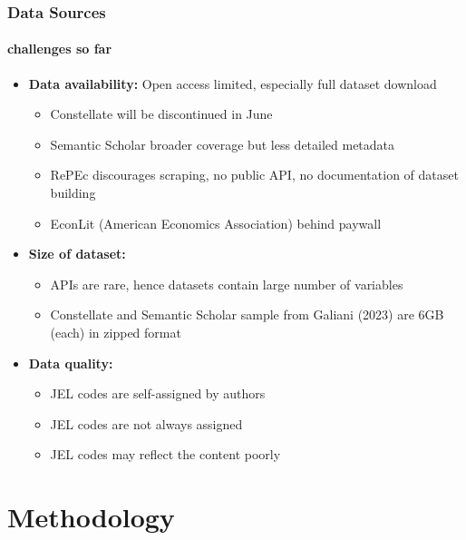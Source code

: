 \documentclass[aspectratio=1610]{beamer}
\begin{document}
\begin{frame}
	\frametitle{Data Sources}
		\framesubtitle{challenges so far}
	
		\begin{itemize}
			\item \textbf{Data availability:} Open access limited, especially full dataset download
			\begin{itemize}
				\item Constellate will be discontinued in June
				\item Semantic Scholar broader coverage but less detailed metadata
				\item RePEc discourages scraping, no public API, no documentation of dataset building
				\item EconLit (American Economics Association) behind paywall
			\end{itemize}
			\item \textbf{Size of dataset:} 
			\begin{itemize}
				\item APIs are rare, hence datasets contain large number of variables
				\item Constellate and Semantic Scholar sample from Galiani (2023) are 6GB (each) in zipped format
			\end{itemize}
			\item \textbf{Data quality:}
			\begin{itemize}
				\item JEL codes are self-assigned by authors
				\item JEL codes are not always assigned
				\item JEL codes may reflect the content poorly
			\end{itemize}
		\end{itemize}
	\end{frame}

\section{Methodology}
\end{document}
